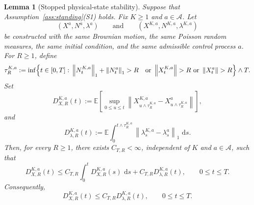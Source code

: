 \documentclass[11pt]{article}
\newtheorem{lemma}[theorem]{Lemma}
\theoremstyle{remarkitalic}
\theoremstyle{remarkitalic}
\newcommand{\E}{\mathbb E}
\newcommand{\dd}{\,\mathrm d}
\newcommand{\1}{\mathbf 1}
\newcommand{\norm}[1]{\left\lVert #1 \right\rVert}
\begin{document}
{
\begin{lemma}[Stopped physical-state stability]
\label{lem:stopped_physical_stability}
Suppose that Assumption~\ref{ass:standing}(S1) holds. Fix
$K\geq1$ and $a\in\mathcal A$. Let
\[
    (X^a,N^a,\lambda^a)
    \qquad\text{and}\qquad
    (X^{K,a},N^{K,a},\lambda^{K,a})
\]
be constructed with the same Brownian motion, the same Poisson random
measures, the same initial condition, and the same admissible control
process $a$. For $R\geq1$, define
\[
\begin{aligned}
\tau_R^{K,a}
:=
\inf\Bigl\{
t\in[0,T]:\;&
\norm{N_t^{K,a}}_1+\norm{N_t^a}_1>R
&\text{or }\norm{X_t^{K,a}}>R
\text{ or }\norm{X_t^a}>R
\Bigr\}
\wedge T.
\end{aligned}
\]
Set
\[
D_{X,R}^{K,a}(t)
:=
\E\left[
    \sup_{0\leq u\leq t}
    \norm{
        X_{u\wedge\tau_R^{K,a}}^{K,a}
        -
        X_{u\wedge\tau_R^{K,a}}^a
    }
\right],
\]
and
\[
D_{\lambda,R}^{K,a}(t)
:=
\E\int_0^{t\wedge\tau_R^{K,a}}
\norm{\lambda_s^{K,a}-\lambda_s^a}_1\,\dd s.
\] Then, for every $R\geq1$, there exists
$C_{T,R}<\infty$, independent of $K$ and
$a\in\mathcal A$, such that
\begin{equation}
\label{eq:stopped_x_stability}
D_{X,R}^{K,a}(t)
\leq
C_{T,R}\int_0^tD_{X,R}^{K,a}(s)\,\dd s
+
C_{T,R}D_{\lambda,R}^{K,a}(t),
\qquad
0\leq t\leq T.
\end{equation}
Consequently,
\begin{equation}
\label{eq:stopped_x_stability_closed}
D_{X,R}^{K,a}(t)
\leq
C_{T,R}D_{\lambda,R}^{K,a}(t),
\qquad
0\leq t\leq T.
\end{equation}
\end{lemma}

}
\end{document}

